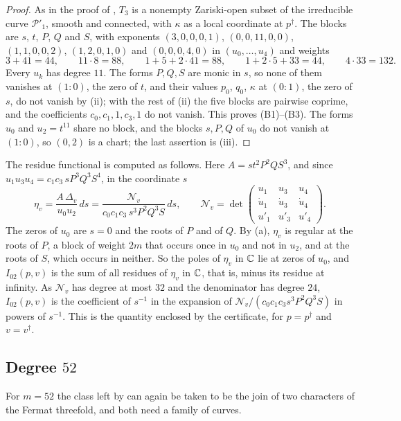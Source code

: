 \begin{proof}
As in the proof of , $T_{3}$ is a nonempty Zariski-open
subset of the irreducible curve $\mathcal P'_{1}$, smooth and connected,
with $\kappa$ as a local coordinate at $p^{\dagger}$. The blocks are $s$,
$t$, $P$, $Q$ and $S$, with exponents $(3,0,0,0,1)$, $(0,0,11,0,0)$,
$(1,1,0,0,2)$, $(1,2,0,1,0)$ and $(0,0,0,4,0)$ in $(u_{0},\dots,u_{4})$ and
weights
\[
  3+41=44,\qquad 11\cdot8=88,\qquad 1+5+2\cdot41=88,\qquad 1+2\cdot5+33=44,
  \qquad 4\cdot33=132.
\]
Every $u_{k}$ has degree $11$. The forms $P,Q,S$ are monic in $s$, so none
of them vanishes at $(1:0)$, the zero of $t$, and their values $p_{0}$,
$q_{0}$, $\kappa$ at $(0:1)$, the zero of $s$, do not vanish by (ii); with
the rest of (ii) the five blocks are pairwise coprime, and the coefficients
$c_{0},c_{1},1,c_{3},1$ do not vanish. This proves (B1)--(B3). The forms $u_{0}$ and $u_{2}=t^{11}$ share no block, and the
blocks $s,P,Q$ of $u_{0}$ do not vanish at $(1:0)$, so $(0,2)$ is a chart;
the last assertion is (iii).
\end{proof}

The residue functional is computed as follows. Here $A=st^{2}P^{2}QS^{3}$,
and since $u_{1}u_{3}u_{4}=c_{1}c_{3}\,sP^{3}Q^{3}S^{4}$, in the coordinate
$s$
\[
  \eta_{v}=\frac{A\,\Delta_{v}}{u_{0}u_{2}}\,ds=\frac{\mathcal N_{v}}
  {c_{0}c_{1}c_{3}\,s^{3}P^{2}Q^{3}S}\,ds,\qquad\mathcal N_{v}=
  \det\begin{pmatrix}u_{1}&u_{3}&u_{4}\\ \dot u_{1}&\dot u_{3}&\dot u_{4}\\
  u'_{1}&u'_{3}&u'_{4}\end{pmatrix}.
\]
The zeros of $u_{0}$ are $s=0$ and the roots of $P$ and of $Q$. By
(a), $\eta_{v}$ is regular at the roots of $P$, a block
of weight $2m$ that occurs once in $u_{0}$ and not in $u_{2}$, and at the
roots of $S$, which occurs in neither. So the poles of $\eta_{v}$ in $\mathbb{C}$
lie at zeros of $u_{0}$, and $I_{02}(p,v)$ is the sum of all residues of
$\eta_{v}$ in $\mathbb{C}$, that is, minus its residue at infinity. As
$\mathcal N_{v}$ has degree at most $32$ and the denominator has degree
$24$, $I_{02}(p,v)$ is the coefficient of $s^{-1}$ in the expansion of
$\mathcal N_{v}/(c_{0}c_{1}c_{3}s^{3}P^{2}Q^{3}S)$ in powers of $s^{-1}$.
This is the quantity enclosed by the certificate, for $p=p^{\dagger}$ and
$v=v^{\dagger}$.

\subsection{Degree \texorpdfstring{$52$}{52}}\label{ssec:degree52}
For $m=52$ the class left by  can again be taken to be the
join of two characters of the Fermat threefold, and both need a family of
curves.

